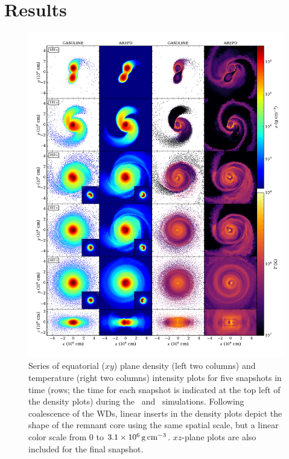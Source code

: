 \section{Results}
\label{sec:c3_results}


\begin{figure}
\centering
\includegraphics[angle=0,width=1.0\columnwidth]{chapter3_zhu+u/figures/snapshots.pdf}
\caption{Series of equatorial ($xy$) plane density (left two columns) and temperature (right two columns) intensity plots for five snapshots in time (rows; the time for each snapshot is indicated at the top left of the density plots) during the \gasoline\ and \arepo\ simulations.  Following coalescence of the WDs, linear inserts in the density plots depict the shape of the remnant core using the same spatial scale, but a linear color scale from $0$ to $3.1\times10^6\,\gcc$.  $xz$-plane plots are also included for the final snapshot.}
\label{fig:c3_diagslice}
\end{figure}

